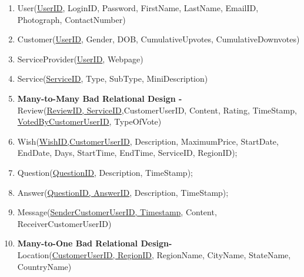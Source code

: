 \documentclass[a4paper]{article}
\begin{document}
\begin{enumerate}

\item User(\underline{UserID}, LoginID, Password, FirstName, LastName, EmailID, Photograph, ContactNumber)

\item Customer(\underline{UserID}, Gender, DOB, CumulativeUpvotes, CumulativeDownvotes)

\item ServiceProvider(\underline{UserID}, Webpage)

\item Service(\underline{ServiceID}, Type, SubType, MiniDescription)

\item  \textbf{Many-to-Many Bad Relational Design -}\\  Review(\underline{ReviewID, ServiceID},CustomerUserID, Content, Rating, TimeStamp, \underline{VotedByCustomerUserID}, TypeOfVote)

\item Wish(\underline{WishID,CustomerUserID}, Description, MaximumPrice, StartDate, EndDate, Days, StartTime, EndTime, ServiceID, RegionID);

\item Question(\underline{QuestionID}, Description, TimeStamp);

\item Answer(\underline{QuestionID, AnswerID}, Description, TimeStamp);

\item Message(\underline {SenderCustomerUserID, Timestamp}, Content, ReceiverCustomerUserID)

\item \textbf{Many-to-One Bad Relational Design- } \\ Location(\underline{CustomerUserID, RegionID}, RegionName, CityName, StateName, CountryName) 
\end{enumerate}
\end{document}
